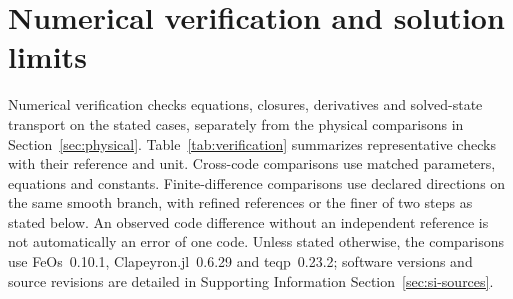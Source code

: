 \section{Numerical verification and solution limits}
\label{sec:verification}
Numerical verification checks equations, closures, derivatives and solved-state transport on the stated cases, separately from the physical comparisons in Section~\ref{sec:physical}.
Table~\ref{tab:verification} summarizes representative checks with their reference and unit.
Cross-code comparisons use matched parameters, equations and constants.
Finite-difference comparisons use declared directions on the same smooth branch, with refined references or the finer of two steps as stated below.
An observed code difference without an independent reference is not automatically an error of one code.
Unless stated otherwise, the comparisons use FeOs~0.10.1, Clapeyron.jl~0.6.29 and teqp~0.23.2; software versions and source revisions are detailed in Supporting Information Section~\ref{sec:si-sources}.

